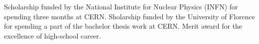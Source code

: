 \documentclass[
  a4paper, 
]{fortysecondscv}
\begin{document}
\begin{cvtable}[2]
	    {Scholarship funded by the National Institute for Nuclear Physics (INFN) for spending three months at CERN.}
	    {Sholarship funded by the University of Florence for spending a part of the bachelor thesis work at CERN.}
	    {Merit award for the excellence of high-school career.}
\end{cvtable}










\end{document}
